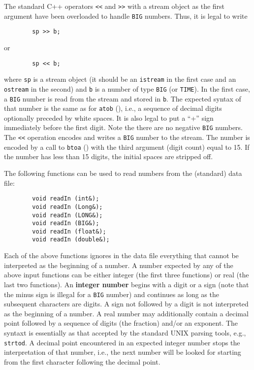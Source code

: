 The standard C++ operators {\tt <<} and {\tt >>} with a stream object as the
first argument have been overloaded to handle {\tt BIG} numbers.
Thus, it is legal to write
\begin{verbatim}
        sp >> b;
\end{verbatim}
or
\begin{verbatim}
        sp << b;
\end{verbatim}
where {\tt sp} is a stream object (it should be an {\tt istream} in the
first case and an {\tt ostream} in the second) and {\tt b} is a number of type
{\tt BIG} (or {\tt TIME}).
In the first case, a {\tt BIG} number is read from the stream and stored in
{\tt b}.
The expected syntax of that number is the same as for {\tt atob}
(), i.e., a sequence of decimal digits optionally
preceded by white spaces.
It is also legal to put a ``+'' sign  immediately before the first digit.
Note the there are no negative {\tt BIG} numbers.
The {\tt <<} operation encodes and writes a {\tt BIG} number to the stream.
The number is encoded by a call to {\tt btoa} () with the third
argument (digit count) equal to 15.
If the number has less than 15 digits, the initial spaces are stripped off.

The following functions can be used to read numbers from the (standard)
data file:
\begin{verbatim}
        void readIn (int&);
        void readIn (Long&);
        void readIn (LONG&);
        void readIn (BIG&);
        void readIn (float&);
        void readIn (double&);
\end{verbatim}

Each of the above functions ignores in the data file everything that
cannot be interpreted as the beginning of a number.
A number expected by any of the above input functions can be either integer
(the first three functions) or real (the last two functions).
An {\bf integer number} begins with a digit or a sign
(note that the minus sign is illegal for a {\tt BIG} number)
and continues as long as the subsequent characters are digits.
A sign not followed by a digit is not interpreted as the beginning of a number.
A real number may additionally contain a decimal
point followed by a sequence of digits (the fraction)
and/or an exponent.
The syntaxt is essentially as that accepted by the standard UNIX parsing
tools, e.g., {\tt strtod}.
A decimal point encountered in an expected integer number
stops the interpretation
of that number, i.e., the next number will be looked for starting from the first
character following the decimal point.


